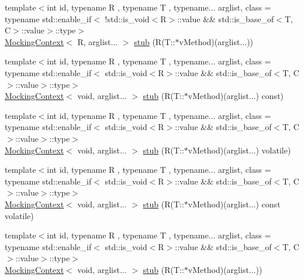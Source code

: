 \begin{DoxyCompactItemize}
\item 
{\footnotesize template$<$int id, typename R , typename T , typename... arglist, class  = typename std\+::enable\+\_\+if$<$                !std\+::is\+\_\+void$<$\+R$>$\+::value \&\& std\+::is\+\_\+base\+\_\+of$<$\+T, C$>$\+::value$>$\+::type$>$ }\\\mbox{\hyperlink{classfakeit_1_1MockingContext}{Mocking\+Context}}$<$ R, arglist... $>$ \mbox{\hyperlink{classfakeit_1_1Mock_a69141994a924c71af3bf9cb4d5a998b6}{stub}} (R(T\+::$\ast$v\+Method)(arglist...))
\item 
{\footnotesize template$<$int id, typename R , typename T , typename... arglist, class  = typename std\+::enable\+\_\+if$<$                std\+::is\+\_\+void$<$\+R$>$\+::value \&\& std\+::is\+\_\+base\+\_\+of$<$\+T, C$>$\+::value$>$\+::type$>$ }\\\mbox{\hyperlink{classfakeit_1_1MockingContext}{Mocking\+Context}}$<$ void, arglist... $>$ \mbox{\hyperlink{classfakeit_1_1Mock_a1861b19f93de559fc183139f1ecdfa6b}{stub}} (R(T\+::$\ast$v\+Method)(arglist...) const)
\item 
{\footnotesize template$<$int id, typename R , typename T , typename... arglist, class  = typename std\+::enable\+\_\+if$<$                std\+::is\+\_\+void$<$\+R$>$\+::value \&\& std\+::is\+\_\+base\+\_\+of$<$\+T, C$>$\+::value$>$\+::type$>$ }\\\mbox{\hyperlink{classfakeit_1_1MockingContext}{Mocking\+Context}}$<$ void, arglist... $>$ \mbox{\hyperlink{classfakeit_1_1Mock_a8bb1a9ff231e91407f6dea872e2c4a4f}{stub}} (R(T\+::$\ast$v\+Method)(arglist...) volatile)
\item 
{\footnotesize template$<$int id, typename R , typename T , typename... arglist, class  = typename std\+::enable\+\_\+if$<$                std\+::is\+\_\+void$<$\+R$>$\+::value \&\& std\+::is\+\_\+base\+\_\+of$<$\+T, C$>$\+::value$>$\+::type$>$ }\\\mbox{\hyperlink{classfakeit_1_1MockingContext}{Mocking\+Context}}$<$ void, arglist... $>$ \mbox{\hyperlink{classfakeit_1_1Mock_a22b83b574e4db2689c8a1f3375554035}{stub}} (R(T\+::$\ast$v\+Method)(arglist...) const volatile)
\item 
{\footnotesize template$<$int id, typename R , typename T , typename... arglist, class  = typename std\+::enable\+\_\+if$<$                std\+::is\+\_\+void$<$\+R$>$\+::value \&\& std\+::is\+\_\+base\+\_\+of$<$\+T, C$>$\+::value$>$\+::type$>$ }\\\mbox{\hyperlink{classfakeit_1_1MockingContext}{Mocking\+Context}}$<$ void, arglist... $>$ \mbox{\hyperlink{classfakeit_1_1Mock_aeedcaacc82d12295f11c3fc454b75554}{stub}} (R(T\+::$\ast$v\+Method)(arglist...))

\end{DoxyCompactItemize}
